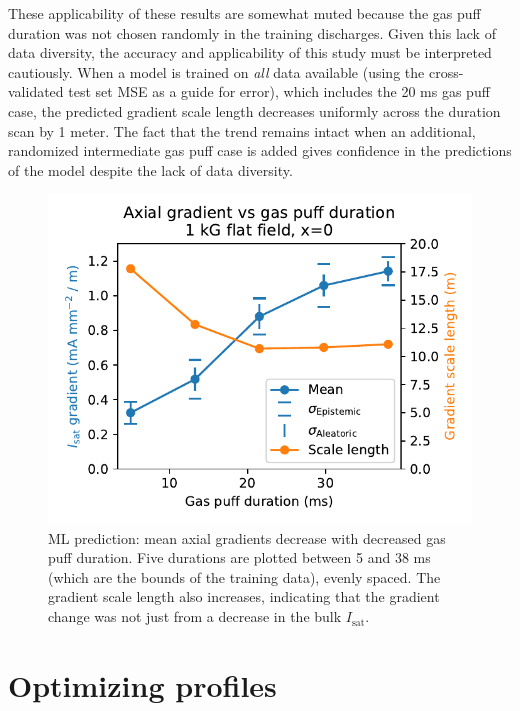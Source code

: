 These applicability of these results are somewhat muted because the gas puff duration was not chosen randomly in the training discharges. 
Given this lack of data diversity, the accuracy and applicability of this study must be interpreted cautiously. When a model is trained on \emph{all} data available (using the cross-validated test set MSE as a guide for error), which includes the 20 ms gas puff case, the predicted gradient scale length decreases uniformly across the duration scan by 1 meter. The fact that the trend remains intact when an additional, randomized intermediate gas puff case is added gives confidence in the predictions of the model despite the lack of data diversity.

\begin{figure}
	\centering
	\includegraphics[width=\columnwidth]{figures/axial-grad_gas-puff.pdf}
	\caption[size=12]{\label{fig:axial-grad_gas-puff.pdf}ML prediction: mean axial gradients decrease with decreased gas puff duration. Five durations are plotted between 5 and 38 ms (which are the bounds of the training data), evenly spaced. The gradient scale length also increases, indicating that the gradient change was not just from a decrease in the bulk $I_\text{sat}$.}
\end{figure}

\section{Optimizing profiles}
\label{sec:optimization}

